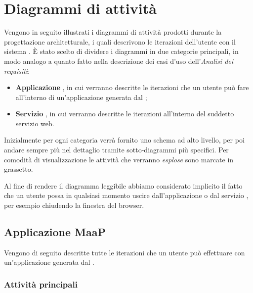 \section{Diagrammi di attività}

Vengono in seguito illustrati i diagrammi di attività prodotti durante la progettazione architetturale, i quali descrivono le iterazioni dell'utente con il sistema . È stato scelto di dividere i diagrammi in due categorie principali, in modo analogo a quanto fatto nella descrizione dei casi d'uso dell'\textit{Analisi dei requisiti}:

\begin{itemize}

	\item \textbf{Applicazione }, in cui verranno descritte le iterazioni che un utente può fare all'interno di un'applicazione generata dal ;
	\item \textbf{Servizio }, in cui verranno descritte le iterazioni all'interno del suddetto servizio web.

\end{itemize}
Inizialmente per ogni categoria verrà fornito uno schema ad alto livello, per poi andare sempre più nel dettaglio tramite sotto-diagrammi più specifici. Per comodità di visualizzazione le attività che verranno \textit{esplose} sono marcate in grassetto. 

Al fine di rendere il diagramma leggibile abbiamo considerato implicito il fatto che un utente possa in qualsiasi momento uscire dall'applicazione  o dal servizio , per esempio chiudendo la finestra del browser.

\subsection{Applicazione MaaP}

Vengono di seguito descritte tutte le iterazioni che un utente può effettuare con un'applicazione generata dal  .


\subsubsection{Attività principali}


